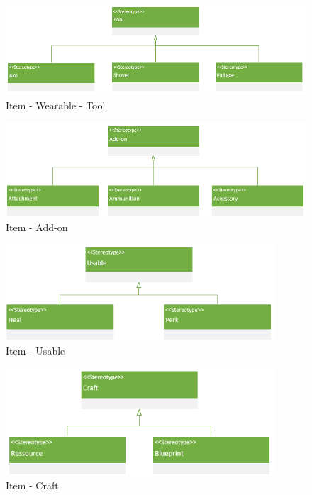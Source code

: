 \begin{figure}[H]
    \begin{center}
    \includegraphics[width=14cm]{10_img/Z_annexeA/item_werable_tool.PNG} 
    \caption{Item - Wearable - Tool}
    \label{A-Tool}
    \end{center}
\end{figure}

\begin{figure}[H]
    \begin{center}
    \includegraphics[width=14cm]{10_img/Z_annexeA/item_addon.PNG} 
    \caption{Item - Add-on}
    \label{A-Add-on}
    \end{center}
\end{figure}

\begin{figure}[H]
    \begin{center}
    \includegraphics[width=10cm]{10_img/Z_annexeA/item_usable.PNG} 
    \caption{Item - Usable}
    \label{A-Usable}
    \end{center}
\end{figure}

\begin{figure}[H]
    \begin{center}
    \includegraphics[width=10cm]{10_img/Z_annexeA/item_craft.PNG} 
    \caption{Item - Craft}
    \label{A-Craft}
    \end{center}
\end{figure}

